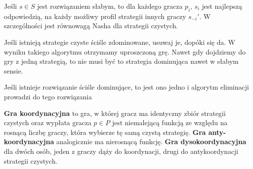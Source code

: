 \begin{fakt}
    Jeśli $s \in S$ jest rozwiązaniem słabym, to dla każdego gracza $p_i$, $s_i$ jest najlepszą odpowiedzią,
    na każdy możliwy profil strategii innych graczy $s_{-i}'$. W szczególności jest równowagą Nasha dla strategii czystych.
\end{fakt}
\begin{fakt}
    Jeśli istnieją strategie czyste ściśle zdominowane, usuwaj je, dopóki się da. 
    W wyniku takiego algorytmu otrzymamy uproszczoną grę.
    Nawet gdy dojdziemy do gry z jedną strategią, to nie musi być to strategia dominująca nawet w słabym sensie.
\end{fakt}
\begin{twierdzenie}
    Jeśli istnieje rozwiązanie ściśle dominujące, to jest ono jedno i algorytm eliminacji prowadzi do tego rozwiązania
\end{twierdzenie}
\begin{definicja}
    \textbf{Gra koordynacyjna} to gra, w której gracz ma identyczny zbiór strategii czystych oraz wypłata gracza
    $p \in P$ jest niemalejącą funkcją ze względu na rosnącą liczbę graczy, która wybierze tę samą czystą strategię. 
    \textbf{Gra anty-koordynacyjna} analogicznie ma nierosnącą funkcję.
    \textbf{Gra dysokoordynacyjna} dla dwóch osób, jeden z graczy dąży do koordynacji, drugi  do antykoordynacji strategii czystych.
\end{definicja}